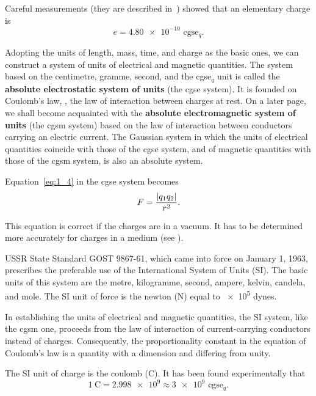 Careful measurements (they are described in~) showed that an elementary charge is
\begin{equation}\label{eq:1_6}
	e = \num{4.80e-10}\text{ cgse$_q$}.
\end{equation}

Adopting the units of length, mass, time, and charge as the basic ones, we can construct a system of units of electrical and magnetic quantities. The system based on the centimetre, gramme, second, and the cgse$_q$ unit is called the \textbf{absolute electrostatic system of units} (the cgse system). It is founded on Coulomb's law, \ie, the law of interaction between charges at rest. On a later page, we shall become acquainted with the \textbf{absolute electromagnetic system of units} (the cgsm system) based on the law of interaction between conductors carrying an electric current. The Gaussian system in which the units of electrical quantities coincide with those of the cgse system, and of magnetic quantities with those of the cgsm system, is also an absolute system.

Equation~\eqref{eq:1_4} in the cgse system becomes
\begin{equation}\label{eq:1_7}
	F = \frac{\left| q_1 q_2 \right|}{r^2}.
\end{equation}

\noindent
This equation is correct if the charges are in a vacuum. It has to be determined more accurately for charges in a medium (see ).

USSR State Standard GOST 9867-61, which came into force on January 1, 1963, prescribes the preferable use of the International System of Units (SI). The basic units of this system are the metre, kilogramme, second, ampere, kelvin, candela, and mole. The SI unit of force is the newton (\si{\newton}) equal to \num{e5} dynes.

In establishing the units of electrical and magnetic quantities, the SI system, like the cgsm one, proceeds from the law of interaction of current-carrying conductors instead of charges. Consequently, the proportionality constant in the equation of Coulomb's law is a quantity with a dimension and differing from unity.

The SI unit of charge is the coulomb (\si{\coulomb}). It has been found experimentally that
\begin{equation}\label{eq:1_8}
	\SI{1}{\coulomb} = \num{2.998e9} \approx \num{3e9}{\text{ cgse$_q$}}.
\end{equation}

